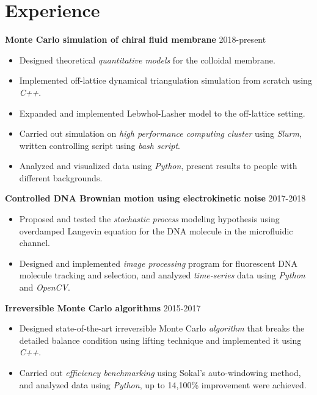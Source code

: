 \documentclass[11pt,letterpaper]{article}
\begin{document}
\section*{Experience}
\vspace*{-0.1in}
\begin{comment}
\textbf{Computational fluid dynamics (CFD) simulation of artificial swimmers} \hfill 2021-present
\vspace*{-0.05in}
\begin{itemize}
    \item Designed swimmer model using \emph{Blender}.
    \item Implemented \emph{OpenFoam} case for the swimmer model using dynamical mesh.
    \item Carried out CFD simulation and worked closely with experimentalist.
\end{itemize}
\end{comment}
\textbf{Monte Carlo simulation of chiral fluid membrane} \hfill 2018-present
\vspace*{-0.05in}
\begin{itemize}
    \item Designed theoretical \emph{quantitative models} for the colloidal membrane.
    \item Implemented off-lattice dynamical triangulation simulation from scratch using \emph{C++}.
    \item Expanded and implemented Lebwhol-Lasher model to the off-lattice setting.
    \item Carried out simulation on \emph{high performance computing cluster} using \emph{Slurm}, written controlling script using \emph{bash script}.
    \item Analyzed and visualized data using \emph{Python}, present results to people with different backgrounds.
\end{itemize}
\textbf{Controlled DNA Brownian motion using electrokinetic noise} \hfill 2017-2018
\vspace*{-0.05in}
\begin{itemize}
    \item Proposed and tested the \emph{stochastic process} modeling hypothesis using overdamped Langevin equation for the DNA molecule in the microfluidic channel.
    \item Designed and implemented \emph{image processing} program for fluorescent DNA molecule tracking and selection, and analyzed \emph{time-series} data using \emph{Python} and \emph{OpenCV}.
\end{itemize}
\textbf{Irreversible Monte Carlo algorithms} \hfill 2015-2017
\vspace*{-0.05in}
\begin{itemize}
    \item Designed state-of-the-art irreversible Monte Carlo \emph{algorithm} that breaks the detailed balance condition using lifting technique and implemented it using \emph{C++}.
    \item Carried out \emph{efficiency benchmarking} using Sokal's auto-windowing method, and analyzed data using \emph{Python}, up to 14,100\% improvement were achieved.
\end{itemize}
\end{document}
